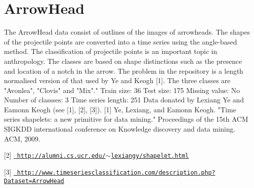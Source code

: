\chapter{Arrow\+Head}
\hypertarget{md_external_2data_2UCRArchive__2018_2ArrowHead_2README}{}\label{md_external_2data_2UCRArchive__2018_2ArrowHead_2README}
\label{md_external_2data_2UCRArchive__2018_2ArrowHead_2README_autotoc_md20}%
%
 The Arrow\+Head data consist of outlines of the images of arrowheads. The shapes of the projectile points are converted into a time series using the angle-\/based method. The classification of projectile points is an important topic in anthropology. The classes are based on shape distinctions such as the presence and location of a notch in the arrow. The problem in the repository is a length normalised version of that used by Ye and Keogh \mbox{[}1\mbox{]}. The three classes are "{}\+Avonlea"{}, "{}\+Clovis"{} and "{}\+Mix"{}."{}  \+Train size\+: 36  \+Test size\+: 175  \+Missing value\+: No  \+Number of classses\+: 3  \+Time series length\+: 251  \+Data donated by Lexiang Ye and Eamonn Keogh (see \mbox{[}1\mbox{]}, \mbox{[}2\mbox{]}, \mbox{[}3\mbox{]}).  \mbox{[}1\mbox{]} Ye, Lexiang, and Eamonn Keogh. "{}Time series shapelets\+: a new primitive for data mining."{} Proceedings of the 15th ACM SIGKDD international conference on Knowledge discovery and data mining. ACM, 2009.

\mbox{[}2\mbox{]} \href{http://alumni.cs.ucr.edu/~lexiangy/shapelet.html}{\texttt{ http\+://alumni.\+cs.\+ucr.\+edu/\texorpdfstring{$\sim$}{\string~}lexiangy/shapelet.\+html}}

\mbox{[}3\mbox{]} \href{http://www.timeseriesclassification.com/description.php?Dataset=ArrowHead}{\texttt{ http\+://www.\+timeseriesclassification.\+com/description.\+php?\+Dataset=\+Arrow\+Head}} 